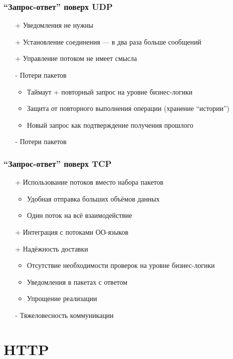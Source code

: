 \documentclass[xetex,mathserif,serif]{beamer}
\begin{document}
	\begin{frame}
		\frametitle{``Запрос-ответ'' поверх UDP}
		\begin{itemize}
			\item[+] Уведомления не нужны
			\item[+] Установление соединения --- в два раза больше сообщений
			\item[+] Управление потоком не имеет смысла
			\item[-] Потери пакетов
			\begin{itemize}
				\item Таймаут + повторный запрос на уровне бизнес-логики
				\item Защита от повторного выполнения операции (хранение ``истории'')
				\item Новый запрос как подтверждение получения прошлого
			\end{itemize}
			\item[-] Потери пакетов
		\end{itemize}
	\end{frame}

	\begin{frame}
		\frametitle{``Запрос-ответ'' поверх TCP}
		\begin{itemize}
			\item[+] Использование потоков вместо набора пакетов
			\begin{itemize}
				\item Удобная отправка больших объёмов данных
				\item Один поток на всё взаимодействие
			\end{itemize}
			\item[+] Интеграция с потоками ОО-языков
			\item[+] Надёжность доставки
			\begin{itemize}
				\item Отсутствие необходимости проверок на уровне бизнес-логики
				\item Уведомления в пакетах с ответом
				\item Упрощение реализации
			\end{itemize}
			\item[-] Тяжеловесность коммуникации
		\end{itemize}
	\end{frame}

	\section{HTTP}
\end{document}
